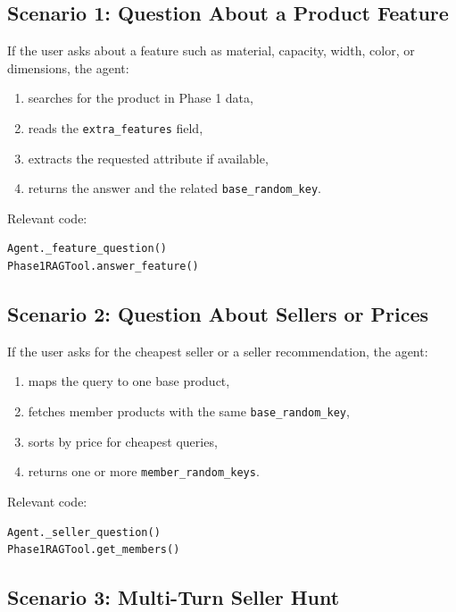 \documentclass[12pt,a4paper]{article}
\begin{document}
\subsection{Scenario 1: Question About a Product Feature}

If the user asks about a feature such as material, capacity, width, color, or dimensions, the agent:

\begin{enumerate}[noitemsep]
  \item searches for the product in Phase 1 data,
  \item reads the \texttt{extra\_features} field,
  \item extracts the requested attribute if available,
  \item returns the answer and the related \texttt{base\_random\_key}.
\end{enumerate}

Relevant code:

\begin{lstlisting}
Agent._feature_question()
Phase1RAGTool.answer_feature()
\end{lstlisting}

\subsection{Scenario 2: Question About Sellers or Prices}

If the user asks for the cheapest seller or a seller recommendation, the agent:

\begin{enumerate}[noitemsep]
  \item maps the query to one base product,
  \item fetches member products with the same \texttt{base\_random\_key},
  \item sorts by price for cheapest queries,
  \item returns one or more \texttt{member\_random\_keys}.
\end{enumerate}

Relevant code:

\begin{lstlisting}
Agent._seller_question()
Phase1RAGTool.get_members()
\end{lstlisting}

\subsection{Scenario 3: Multi-Turn Seller Hunt}
\end{document}
